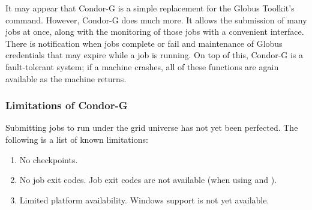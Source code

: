 
It may appear that Condor-G is a simple replacement
for the Globus Toolkit's  command.
However, Condor-G does much more.
It allows the submission of many jobs at once,
along with the monitoring of those jobs with a convenient interface.
There is notification when jobs complete or fail
and maintenance of Globus credentials
that may expire while a job is running.
On top of this, Condor-G is a fault-tolerant system;
if a machine crashes,
all of these functions are again available as the machine returns.










\subsubsection{\label{sec:Condor-G-Limits}Limitations of Condor-G}
Submitting jobs to run under the grid universe has not yet
been perfected.
The following is a list of known limitations:

\begin{enumerate}
\item{No checkpoints.}
\item{No job exit codes.}
Job exit codes are not available (when using
 and ).
\item{Limited platform availability.}
Windows support is not yet available.
\end{enumerate}



